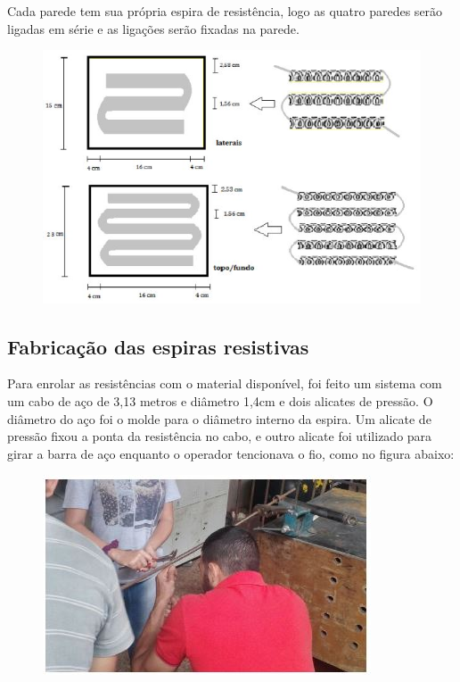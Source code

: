 Cada parede tem sua própria espira de resistência, logo as quatro paredes serão ligadas em série e as ligações serão fixadas na parede.
\begin{figure}[H]
	\centering
	\label{resistencia3}
	\includegraphics[keepaspectratio=true,scale=1.0]{figuras/alimentacao5.JPG}
\end{figure}


\subsection{Fabricação das espiras resistivas}
Para enrolar as resistências com o material disponível, foi feito um sistema com um cabo de aço de 3,13 metros e diâmetro 1,4cm e dois alicates de pressão. O diâmetro do aço foi o molde para o diâmetro interno da espira. Um alicate de pressão fixou a ponta da resistência no cabo, e outro alicate foi utilizado para girar a barra de aço enquanto o operador tencionava o fio, como no figura abaixo:
\begin{figure}[H]
	\centering
	\label{foto1}
	\includegraphics[keepaspectratio=true,scale=1.0]{figuras/alimentacao6.JPG}
\end{figure}

